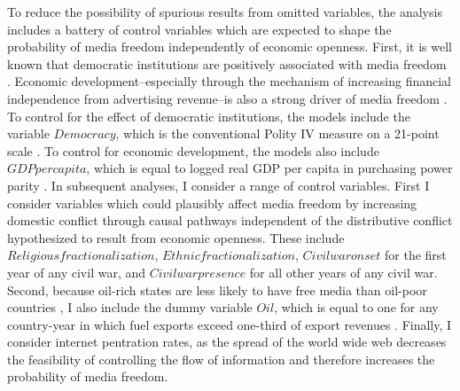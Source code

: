 \documentclass[12pt,a4paper]{article}
\begin{document}
To reduce the possibility of spurious results from omitted variables, the analysis includes a battery of control variables which are expected to shape the probability of media freedom independently of economic openness. First, it is well known that democratic institutions are positively associated with media freedom \parencite[13]{Islam:2008wj}. Economic development--especially through the mechanism of increasing financial independence from advertising revenue--is also a strong driver of media freedom \parencites{Petrova:2011ca}{lawson2002building}. To control for the effect of democratic institutions, the models include the variable $Democracy$, which is the conventional Polity IV measure on a 21-point scale \parencite{PolityIVProjectP:2011uq}. To control for economic development, the models also include $GDP per capita$, which is equal to logged real GDP per capita in purchasing power parity \parencite{Heston:HB3Tvq3w}. In subsequent analyses, I consider a range of control variables. First I consider variables which could plausibly affect media freedom by increasing domestic conflict through causal pathways independent of the distributive conflict hypothesized to result from economic openness. These include $Religious fractionalization$, $Ethnic fractionalization$, $Civil war onset$ for the first year of any civil war, and $Civil war presence$ for all other years of any civil war. Second, because oil-rich states are less likely to have free media than oil-poor countries \parencite{Egorov:2009hc}, I also include the dummy variable $Oil$, which is equal to one for any country-year in which fuel exports exceed one-third of export revenues \parencite{Fearon:2003ht}. Finally, I consider internet pentration rates, as the spread of the world wide web decreases the feasibility of controlling the flow of information and therefore increases the probability of media freedom.
\end{document}
